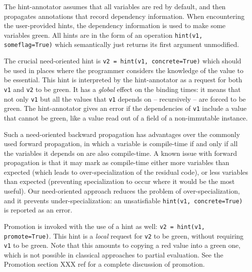 The hint-annotator assumes that all variables are red by default, and
then propagates annotations that record dependency information.
When encountering the user-provided hints, the dependency information
is used to make some variables green.  All
hints are in the form of an operation \texttt{hint(v1, someflag=True)}
which semantically just returns its first argument unmodified.

The crucial need-oriented hint is \texttt{v2 = hint(v1, concrete=True)}
which should be used in places where the programmer considers the
knowledge of the value to be essential.  This hint is interpreted by
the hint-annotator as a request for both \texttt{v1} and \texttt{v2} to be green.  It
has a \emph{global} effect on the binding times: it means that not only
\texttt{v1} but all the values that \texttt{v1} depends on – recursively –
are forced to be green.  The hint-annotator gives an error if the
dependencies of \texttt{v1} include a value that cannot be green, like
a value read out of a field of a non-immutable instance.

Such a need-oriented backward propagation has advantages over the
commonly used forward propagation, in which a variable is compile-time
if and only if all the variables it depends on are also compile-time.  A
known issue with forward propagation is that it may mark as compile-time
either more variables than expected (which leads to over-specialization
of the residual code), or less variables than expected (preventing
specialization to occur where it would be the most useful).  Our
need-oriented approach reduces the problem of over-specialization, and
it prevents under-specialization: an unsatisfiable \texttt{hint(v1,
concrete=True)} is reported as an error.

Promotion is invoked with the use of a hint as well:
\texttt{v2 = hint(v1, promote=True)}.
This hint is a \emph{local} request for \texttt{v2} to be green, without
requiring \texttt{v1} to be green.  Note that this amounts to copying
a red value into a green one, which is not possible in classical
approaches to partial evaluation.  See the Promotion section XXX ref for a
complete discussion of promotion.

